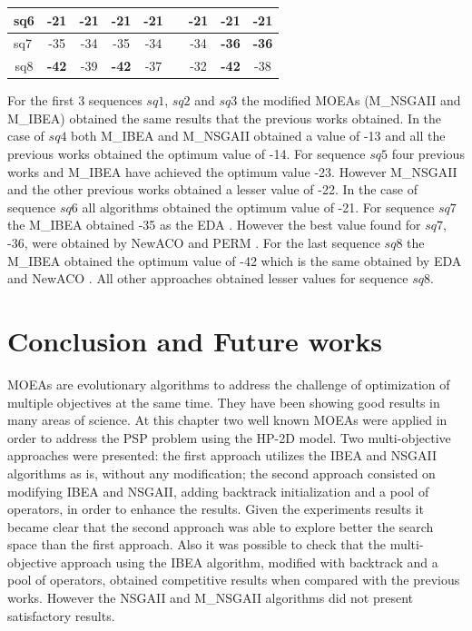 \begin{table}[]
\begin{tabular}{ccccccccc}
		\multicolumn{1}{l}{sq6} & \textbf{-21} & \textbf{-21} & \textbf{-21} & \textbf{-21} &              & \textbf{-21} & \textbf{-21} & \textbf{-21} \\ \hline
		\multicolumn{1}{l}{sq7} & -35          & -34          & -35          & -34          &              & -34          & \textbf{-36} & \textbf{-36} \\ \hline
		sq8                     & \textbf{-42} & -39          & \textbf{-42} & -37          &              & -32          & \textbf{-42} & -38          \\ \hline
	\end{tabular}
\end{table}


 For the first 3 sequences $sq1$, $sq2$ and $sq3$ the modified MOEAs (M\_NSGAII and M\_IBEA) obtained the same results that the previous works obtained. In the case of $sq4$ both M\_IBEA and M\_NSGAII obtained a value of -13 and all the previous works obtained the optimum value of -14. For sequence $sq5$ four previous works and M\_IBEA have achieved the optimum value -23. However M\_NSGAII and the other previous works obtained a lesser value of -22. In the case of sequence $sq6$ all algorithms obtained the optimum value of -21. For sequence $sq7$ the M\_IBEA obtained -35 as the EDA \cite{santana2008protein}. However the best value found  for $sq7$, -36, were obtained by NewACO \cite{shmygelska2003improved} and PERM \cite{hsu2003growth}. For the last sequence $sq8$ the M\_IBEA obtained the optimum value of -42 which is the same obtained by EDA \cite{santana2008protein} and NewACO \cite{shmygelska2003improved}. All other approaches obtained lesser values for sequence $sq8$.

\section{Conclusion and Future works} \label{sec:conclusion}


MOEAs are evolutionary algorithms to address the challenge of optimization of multiple objectives at the same time. They have been showing good results in many areas of science. At this chapter two well known MOEAs were applied in order to address the PSP problem using the HP-2D model. Two multi-objective approaches were presented: the first approach utilizes the IBEA and NSGAII algorithms as is, without any modification; the second approach consisted on modifying IBEA and NSGAII, adding backtrack initialization and a pool of operators, in order to enhance the results. Given the experiments results it became clear that the second approach was able to explore better the search space than the first approach. Also it was possible to check that the multi-objective approach using the IBEA algorithm, modified with backtrack and a pool of operators, obtained competitive results when compared with the previous works. However the NSGAII and M\_NSGAII algorithms did not present satisfactory results. 


